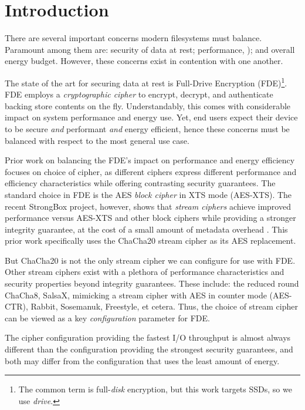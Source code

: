 \section{Introduction}\label{sec:introduction}

There are several important concerns modern filesystems must balance. Paramount
among them are: security of data at rest; performance, ); and overall energy budget. However, these concerns exist in
contention with one another. 

The state of the art for securing data at rest is Full-Drive Encryption
(FDE)\footnote{The common term is full-\emph{disk} encryption, but this work
targets SSDs, so we use \emph{drive}.}. FDE employs a \emph{cryptographic
cipher} to encrypt, decrypt, and authenticate backing store contents on the fly.
Understandably, this comes with considerable impact on system performance and
energy use.  Yet, end users expect their device to be secure
\emph{and} performant \emph{and} energy efficient, hence these concerns must be
balanced with respect to the most general use case.

Prior work on balancing the FDE's impact on performance and energy efficiency
focuses on choice of cipher, as different ciphers express different performance
and efficiency characteristics while offering contrasting security guarantees.
The standard choice in FDE is the AES \emph{block cipher} in XTS mode (AES-XTS).
The recent StrongBox project, however, shows that \emph{stream ciphers} achieve
improved performance versus AES-XTS and other block ciphers while providing a
stronger integrity guarantee, at the cost of a small amount of metadata overhead
\cite{StrongBox}. This prior work specifically uses the ChaCha20 stream
cipher\cite{ChaCha20} as its AES replacement.

But ChaCha20 is not the only stream cipher we can configure for use with FDE.
Other stream ciphers exist with a plethora of performance characteristics and
security properties beyond integrity guarantees. These include: the reduced
round ChaCha8\cite{ChaCha8}, SalsaX\cite{SalsaX}, mimicking a stream cipher with
AES in counter mode (AES-CTR)\cite{AES-CTR}, Rabbit\cite{Rabbit},
Sosemanuk\cite{Sosemanuk}, Freestyle\cite{Freestyle}, et cetera. Thus, the
choice of stream cipher can be viewed as a key \emph{configuration} parameter
for FDE.

The cipher configuration providing the fastest I/O throughput is almost always
different than the configuration providing the strongest security guarantees,
and both may differ from the configuration that uses the least amount of energy.

